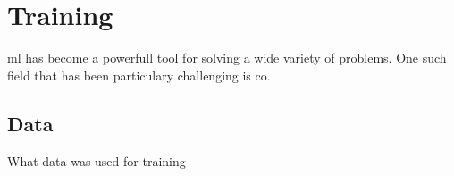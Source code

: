 \chapter{Training}

\gls{ml} has become a powerfull tool for solving a wide variety of problems. One such field that has been particulary challenging is \gls{co}. 

\section{Data}

What data was used for training